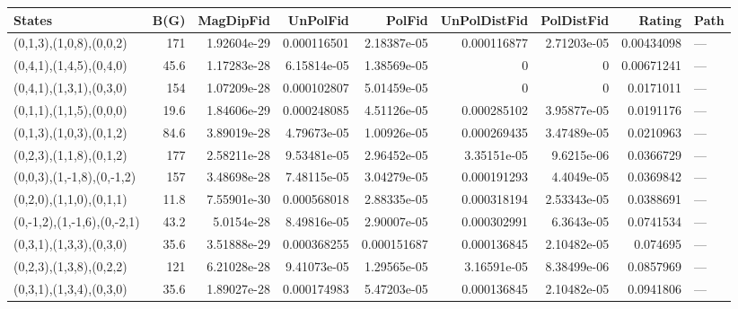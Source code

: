 \begin{tabular}{lrrrrrrrl}
\hline
 States                     &   B(G) &   MagDipFid &    UnPolFid &      PolFid &   UnPolDistFid &   PolDistFid &     Rating & Path   \\
\hline
 (0,1,3),(1,0,8),(0,0,2)    &  171   & 1.92604e-29 & 0.000116501 & 2.18387e-05 &    0.000116877 &  2.71203e-05 & 0.00434098 & ---    \\
 (0,4,1),(1,4,5),(0,4,0)    &   45.6 & 1.17283e-28 & 6.15814e-05 & 1.38569e-05 &    0           &  0           & 0.00671241 & ---    \\
 (0,4,1),(1,3,1),(0,3,0)    &  154   & 1.07209e-28 & 0.000102807 & 5.01459e-05 &    0           &  0           & 0.0171011  & ---    \\
 (0,1,1),(1,1,5),(0,0,0)    &   19.6 & 1.84606e-29 & 0.000248085 & 4.51126e-05 &    0.000285102 &  3.95877e-05 & 0.0191176  & ---    \\
 (0,1,3),(1,0,3),(0,1,2)    &   84.6 & 3.89019e-28 & 4.79673e-05 & 1.00926e-05 &    0.000269435 &  3.47489e-05 & 0.0210963  & ---    \\
 (0,2,3),(1,1,8),(0,1,2)    &  177   & 2.58211e-28 & 9.53481e-05 & 2.96452e-05 &    3.35151e-05 &  9.6215e-06  & 0.0366729  & ---    \\
 (0,0,3),(1,-1,8),(0,-1,2)  &  157   & 3.48698e-28 & 7.48115e-05 & 3.04279e-05 &    0.000191293 &  4.4049e-05  & 0.0369842  & ---    \\
 (0,2,0),(1,1,0),(0,1,1)    &   11.8 & 7.55901e-30 & 0.000568018 & 2.88335e-05 &    0.000318194 &  2.53343e-05 & 0.0388691  & ---    \\
 (0,-1,2),(1,-1,6),(0,-2,1) &   43.2 & 5.0154e-28  & 8.49816e-05 & 2.90007e-05 &    0.000302991 &  6.3643e-05  & 0.0741534  & ---    \\
 (0,3,1),(1,3,3),(0,3,0)    &   35.6 & 3.51888e-29 & 0.000368255 & 0.000151687 &    0.000136845 &  2.10482e-05 & 0.074695   & ---    \\
 (0,2,3),(1,3,8),(0,2,2)    &  121   & 6.21028e-28 & 9.41073e-05 & 1.29565e-05 &    3.16591e-05 &  8.38499e-06 & 0.0857969  & ---    \\
 (0,3,1),(1,3,4),(0,3,0)    &   35.6 & 1.89027e-28 & 0.000174983 & 5.47203e-05 &    0.000136845 &  2.10482e-05 & 0.0941806  & ---    \\
\hline
\end{tabular}